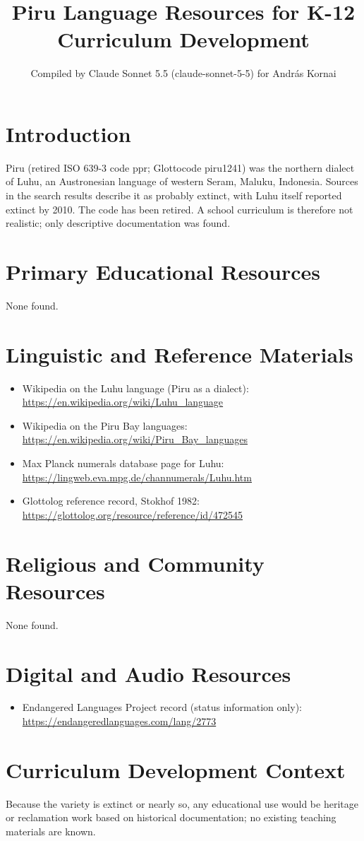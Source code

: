 \documentclass[12pt]{article}
\title{Piru Language Resources for K-12 Curriculum Development}
\author{Compiled by Claude Sonnet 5.5 (claude-sonnet-5-5) for Andr\'as Kornai}
\date{}
\begin{document}
\maketitle

\section{Introduction}
Piru (retired ISO 639-3 code ppr; Glottocode piru1241) was the northern dialect of Luhu, an Austronesian language of western Seram, Maluku, Indonesia. Sources in the search results describe it as probably extinct, with Luhu itself reported extinct by 2010. The code has been retired. A school curriculum is therefore not realistic; only descriptive documentation was found.

\section{Primary Educational Resources}
None found.

\section{Linguistic and Reference Materials}
\begin{itemize}
\item Wikipedia on the Luhu language (Piru as a dialect): \url{https://en.wikipedia.org/wiki/Luhu_language}
\item Wikipedia on the Piru Bay languages: \url{https://en.wikipedia.org/wiki/Piru_Bay_languages}
\item Max Planck numerals database page for Luhu: \url{https://lingweb.eva.mpg.de/channumerals/Luhu.htm}
\item Glottolog reference record, Stokhof 1982: \url{https://glottolog.org/resource/reference/id/472545}
\end{itemize}

\section{Religious and Community Resources}
None found.

\section{Digital and Audio Resources}
\begin{itemize}
\item Endangered Languages Project record (status information only): \url{https://endangeredlanguages.com/lang/2773}
\end{itemize}

\section{Curriculum Development Context}
Because the variety is extinct or nearly so, any educational use would be heritage or reclamation work based on historical documentation; no existing teaching materials are known.
\end{document}
